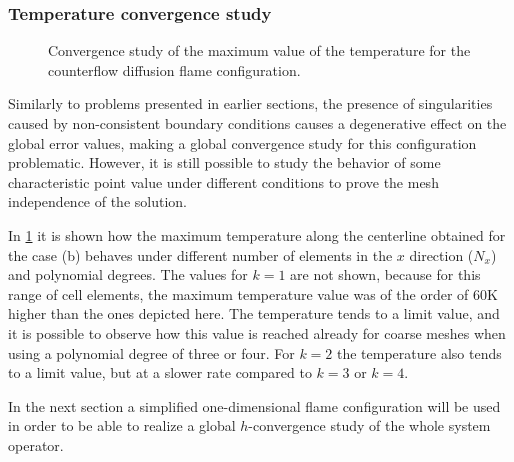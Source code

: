 \subsubsection{Temperature convergence study}
\begin{figure}[h]
	\centering
	\caption{Convergence study of the maximum value of the temperature for the counterflow diffusion flame configuration.}
	\label{fig:TemperatureConvergenceDiffFlame}
\end{figure}
Similarly to problems presented in earlier sections, the presence of singularities caused by non-consistent boundary conditions causes a degenerative effect on the global error values, making a global convergence study for this configuration problematic. However, it is still possible to study the behavior of some characteristic point value under different conditions to prove the mesh independence of the solution.

In \cref{fig:TemperatureConvergenceDiffFlame} it is shown how the maximum temperature along the centerline obtained for the case (b)  behaves under different number of elements in the $x$ direction ($N_x$) and polynomial degrees. The values for $k=1$ are not shown, because for this range of cell elements, the maximum temperature value was of the order of 60K higher than the ones depicted here. The temperature tends to a limit value, and it is possible to observe how this value is reached already for coarse meshes when using a polynomial degree of three or four. For $k=2$ the temperature also tends to a limit value, but at a slower rate compared to $k =3$ or $k = 4$. 

In the next section a simplified one-dimensional flame configuration will be used in order to be able to realize a global $h$-convergence study of the whole system operator.

